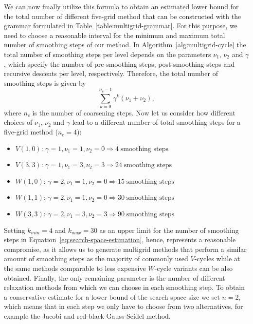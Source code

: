 We can now finally utilize this formula to obtain an estimated lower bound for the total number of different five-grid method that can be constructed with the grammar formulated in Table~\ref{table:multigrid-grammar}.
For this purpose, we need to choose a reasonable interval for the minimum and maximum total number of smoothing steps of our method.
In Algorithm~\ref{alg:multigrid-cycle} the total number of smoothing steps per level depends on the parameters $\nu_1$, $\nu_2$ and $\gamma$, which specify the number of pre-smoothing steps, post-smoothing steps and recursive descents per level, respectively.
Therefore, the total number of smoothing steps is given by
\begin{equation*}
	\sum_{k = 0}^{n_c - 1} \gamma^k (\nu_1 + \nu_2),
\end{equation*}
where $n_c$ is the number of coarsening steps.
Now let us consider how different choices of $\nu_1$, $\nu_2$ and $\gamma$ lead to a different number of total smoothing steps for a five-grid method ($n_c = 4$):
\begin{itemize}
	\item $V(1,0)$: $\gamma = 1, \nu_1 = 1, \nu_2 = 0 \Rightarrow 4 \; \text{smoothing steps}$
	\item $V(3,3)$: $\gamma = 1, \nu_1 = 3, \nu_2 = 3 \Rightarrow 24 \; \text{smoothing steps}$
	\item $W(1,0)$: $\gamma = 2, \nu_1 = 1, \nu_2 = 0 \Rightarrow 15 \; \text{smoothing steps}$
	\item $W(1,1)$: $\gamma = 2, \nu_1 = 1, \nu_2 = 0 \Rightarrow 30 \; \text{smoothing steps}$
	\item $W(3,3)$: $\gamma = 2, \nu_1 = 3, \nu_2 = 3 \Rightarrow 90 \; \text{smoothing steps}$
\end{itemize}
Setting $k_{min} = 4$ and $k_{max} = 30$ as an upper limit for the number of smoothing steps in Equation~\ref{eq:search-space-estimation}, hence, represents a reasonable compromise, as it allows us to generate multigrid methods that perform a similar amount of smoothing steps as the majority of commonly used $V$-cycles while at the same methods comparable to less expensive $W$-cycle variants can be also obtained.
Finally, the only remaining parameter is the number of different relaxation methods from which we can choose in each smoothing step.
To obtain a conservative estimate for a lower bound of the search space size we set $n = 2$, which means that in each step we only have to choose from two alternatives, for example the Jacobi and red-black Gauss-Seidel method.
